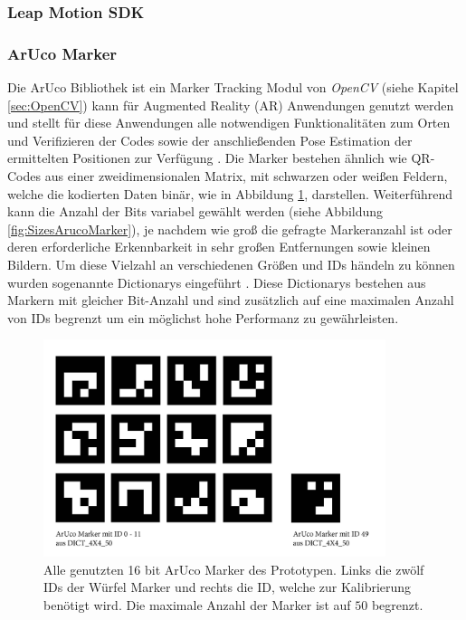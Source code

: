 
\subsubsection{Leap Motion SDK} \label{sec:LeapSDK}
\subsubsection{ArUco Marker} \label{sec:aruco} 
Die ArUco Bibliothek ist ein Marker Tracking Modul von \textit{OpenCV} (siehe Kapitel \ref{sec:OpenCV}) kann für Augmented Reality (AR) Anwendungen genutzt werden und stellt für diese Anwendungen alle notwendigen Funktionalitäten zum Orten und Verifizieren der Codes sowie der anschließenden Pose Estimation der ermittelten Positionen zur Verfügung \cite{article:Aruco2014}. 
Die Marker bestehen ähnlich wie QR-Codes aus einer zweidimensionalen Matrix, mit schwarzen oder weißen Feldern, welche die kodierten Daten binär, wie in Abbildung \ref{fig:AllUsedArucoMarker}, darstellen.  Weiterführend kann die Anzahl der Bits variabel gewählt werden (siehe Abbildung \ref{fig:SizesArucoMarker}), je nachdem wie groß die gefragte Markeranzahl ist oder deren erforderliche Erkennbarkeit in sehr großen Entfernungen sowie kleinen Bildern. Um diese Vielzahl an verschiedenen Größen und IDs händeln zu können wurden sogenannte Dictionarys eingeführt \cite{article:ArucoDictGarridoJurado2015}. Diese Dictionarys bestehen aus Markern mit gleicher Bit-Anzahl und sind zusätzlich auf eine maximalen Anzahl von IDs begrenzt um ein möglichst hohe Performanz zu gewährleisten.\\


\begin{figure}[H] 
	\center 
	\includegraphics[width=10cm]{Bilder/Aruco_marker.jpg}			
	\caption{Alle genutzten 16 bit ArUco Marker des Prototypen. Links die zwölf IDs der Würfel Marker und rechts die ID, welche zur Kalibrierung benötigt wird. Die maximale Anzahl der Marker ist auf $50$ begrenzt.}
	\label{fig:AllUsedArucoMarker}
\end{figure}

